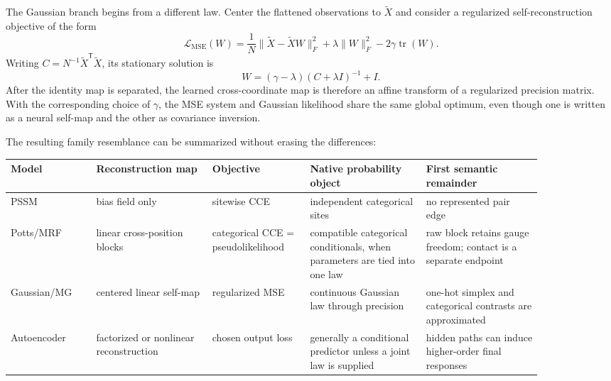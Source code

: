 The Gaussian branch begins from a different law.  Center the flattened observations to
$\widetilde X$ and consider a regularized self-reconstruction objective of the form
\begin{equation}
\mathcal L_{\mathrm{MSE}}(W)
=\frac1N\|\widetilde X-\widetilde XW\|_F^2
+\lambda\|W\|_F^2-2\gamma\operatorname{tr}(W).
\label{eq:book-unified-mse}
\end{equation}
Writing $C=N^{-1}\widetilde X^{\mathsf T}\widetilde X$, its stationary solution is
\begin{equation}
W=(\gamma-\lambda)(C+\lambda I)^{-1}+I.
\label{eq:book-unified-mse-solution}
\end{equation}
After the identity map is separated, the learned cross-coordinate map is therefore an affine
transform of a regularized precision matrix.  With the corresponding choice of $\gamma$, the MSE
system and Gaussian likelihood share the same global optimum, even though one is written as a
neural self-map and the other as covariance inversion.

The resulting family resemblance can be summarized without erasing the differences:
\begin{center}
\small
\begin{tabular}{@{}>{\raggedright\arraybackslash}p{0.14\linewidth}
                >{\raggedright\arraybackslash}p{0.19\linewidth}
                >{\raggedright\arraybackslash}p{0.16\linewidth}
                >{\raggedright\arraybackslash}p{0.19\linewidth}
                >{\raggedright\arraybackslash}p{0.19\linewidth}@{}}
\toprule
Model & Reconstruction map & Objective & Native probability object & First semantic remainder \\
\midrule
PSSM & bias field only & sitewise CCE & independent categorical sites & no represented pair edge \\
Potts/MRF & linear cross-position blocks & categorical CCE = pseudolikelihood & compatible categorical conditionals, when parameters are tied into one law & raw block retains gauge freedom; contact is a separate endpoint \\
Gaussian/MG & centered linear self-map & regularized MSE & continuous Gaussian law through precision & one-hot simplex and categorical contrasts are approximated \\
Autoencoder & factorized or nonlinear reconstruction & chosen output loss & generally a conditional predictor unless a joint law is supplied & hidden paths can induce higher-order final responses \\
\bottomrule
\end{tabular}
\end{center}

